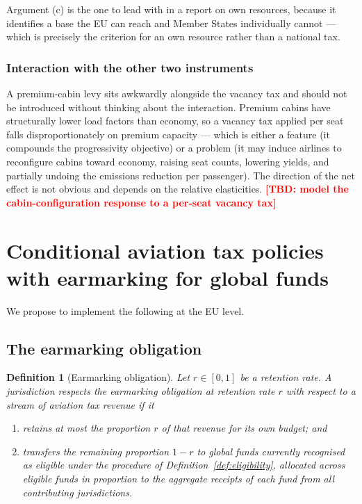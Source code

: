 \documentclass[11pt]{article}
\newtheorem{definition}{Definition}
\newcommand{\tbd}[1]{\textcolor{red}{\textbf{[TBD: #1]}}}
\begin{document}
Argument (c) is the one to lead with in a report on own resources, because it
identifies a base the EU can reach and Member States individually cannot ---
which is precisely the criterion for an own resource rather than a national tax.

\subsubsection{Interaction with the other two instruments}

A premium-cabin levy sits awkwardly alongside the vacancy tax and should not be
introduced without thinking about the interaction. Premium cabins have
structurally lower load factors than economy, so a vacancy tax applied per seat
falls disproportionately on premium capacity --- which is either a feature (it
compounds the progressivity objective) or a problem (it may induce airlines to
reconfigure cabins toward economy, raising seat counts, lowering yields, and
partially undoing the emissions reduction per passenger). The direction of the
net effect is not obvious and depends on the relative elasticities.
\tbd{model the cabin-configuration response to a per-seat vacancy tax}

\section{Conditional aviation tax policies with earmarking for global funds}
\label{sec:conditional}

We propose to implement the following at the EU level.

\subsection{The earmarking obligation}

\begin{definition}[Earmarking obligation]
\label{def:earmark}
Let $r \in [0,1]$ be a \emph{retention rate}. A jurisdiction respects the
\emph{earmarking obligation at retention rate $r$} with respect to a stream of
aviation tax revenue if it
\begin{enumerate}[label=(\roman*)]
  \item retains at most the proportion $r$ of that revenue for its own budget;
  and
  \item transfers the remaining proportion $1-r$ to global funds currently
  recognised as eligible under the procedure of
  Definition~\ref{def:eligibility}, allocated across eligible funds in
  proportion to the aggregate receipts of each fund from all contributing
  jurisdictions.
\end{enumerate}
\end{definition}
\end{document}
